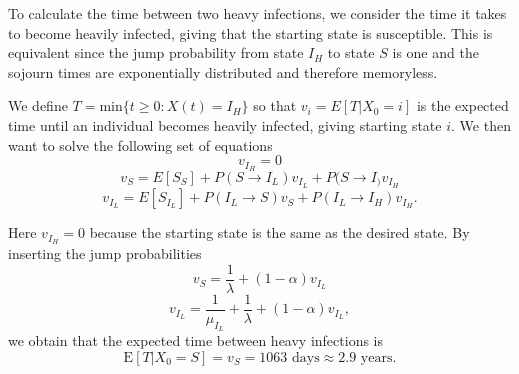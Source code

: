 To calculate the time between two heavy infections, we consider the time it takes to become heavily infected, giving that the starting state is susceptible. This is equivalent since the jump probability from state $I_H$ to state $S$ is one and the sojourn times are exponentially distributed and therefore memoryless.

We define $T = \text{min}\{t \geq 0 : X(t)=I_H\}$ so that $v_i = E\left[T|X_0 = i \right]$ is the expected time until an individual becomes heavily infected, giving starting state $i$. We then want to solve the following set of equations 
$$v_{I_H} = 0$$
$$v_{S} = E[S_S] + P(S \rightarrow I_L) v_{I_L}+ P(S \rightarrow I_) v_{I_H} $$
$$v_{I_L} = E[S_{I_L}] + P(I_L \rightarrow S) v_S + P(I_L \rightarrow I_H) v_{I_H}. $$

Here $v_{I_H} = 0$ because the starting state is the same as the desired state. By inserting the jump probabilities 
$$ v_{S} = \frac{1}{\lambda} + (1-\alpha) v_{I_L} $$
$$ v_{I_L} =  \frac{1}{\mu_{I_L}}+  \frac{1}{\lambda} + (1-\alpha) v_{I_L}, $$
 we obtain that the expected time between heavy infections is
$$\text{E}\left[T|X_0=S \right] = v_S = 1063 \text{ days} \approx 2.9 \text{ years}.$$ 